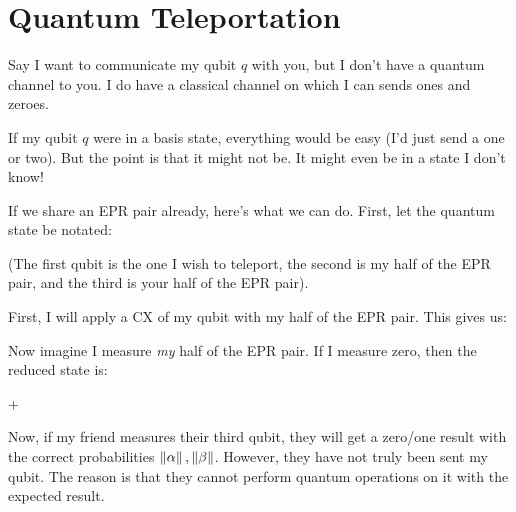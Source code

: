 \newcommand{\zzket}{\braket{00}}
\newcommand{\zoket}{\braket{01}}
\newcommand{\ozket}{\braket{10}}
\newcommand{\ooket}{\braket{11}}

\newcommand{\zzzket}{\braket{000}}
\newcommand{\zzoket}{\braket{001}}
\newcommand{\zozket}{\braket{010}}
\newcommand{\zooket}{\braket{011}}
\newcommand{\ozzket}{\braket{100}}
\newcommand{\ozoket}{\braket{101}}
\newcommand{\oozket}{\braket{110}}
\newcommand{\oooket}{\braket{111}}

\section{Quantum Teleportation}

\begin{remark}
  Say I want to communicate my qubit $q$ with you, but I don't have a
  quantum channel to you. I do have a classical channel on which I can
  sends ones and zeroes.

  If my qubit $q$ were in a basis state, everything would be easy (I'd
  just send a one or two). But the point is that it might not be. It
  might even be in a state I don't know!

  If we share an EPR pair already, here's what we can do. First, let the
  quantum state be notated:

  \begin{nedqn}
    \parens{
      \alpha \zket + \beta \oket
    }
    \otimes
    \sqtot
    \parens{
      \zzket + \ooket
    }
  \end{nedqn}

  \noindent
  (The first qubit is the one I wish to teleport, the second is my half
  of the EPR pair, and the third is your half of the EPR pair).

  First, I will apply a CX of my qubit with my half of the EPR pair.
  This gives us:

  \begin{nedqn}
    \sqtot
    \parens{
      \alpha \zzzket
      + \alpha \zooket
      + \beta \oozket
      + \beta \ozoket
    }
  \end{nedqn}

  \noindent
  Now imagine I measure \emph{my} half of the EPR pair. If I measure
  zero, then the reduced state is:

  \begin{nedqn}
    \alpha {} + \beta {}
  \end{nedqn}

  \noindent
  Now, if my friend measures their third qubit, they will get a zero/one
  result with the correct probabilities $\left\Vert \alpha \right\Vert, \left\Vert \beta \right\Vert$.
  However, they have not truly been sent my qubit. The reason is that
  they cannot perform quantum operations on it with the expected result.


\end{remark}
